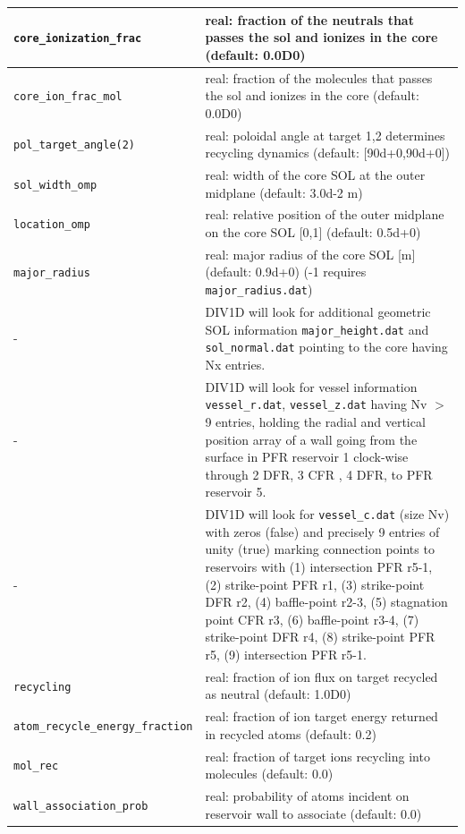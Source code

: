 \documentclass[amsmath,amssymb,a4]{revtex4-2}
\begin{document}
\begin{longtable}{| p{} | p{} |}
    {\tt core\_ionization\_frac } & real: fraction of the neutrals that passes the sol and ionizes in the core (default: 0.0D0) \\ \hline
       {\tt core\_ion\_frac\_mol } & real: fraction of the molecules that passes the sol and ionizes in the core (default: 0.0D0) \\ \hline 
    {\tt  pol\_target\_angle(2)}& real: poloidal angle at target 1,2  determines recycling dynamics (default: [90d+0,90d+0]) \\ \hline  
    {\tt sol\_width\_omp}       & real: width of the core SOL at the outer midplane (default: 3.0d-2 m)\\ \hline  
    {\tt location\_omp }        & real: relative position of the outer midplane on the core SOL [0,1] 	(default: 0.5d+0) \\ \hline 
    {\tt major\_radius }        &  real:  major radius of the core SOL [m] (default: 0.9d+0) (-1 requires {\tt major\_radius.dat})\\ \hline    
    - & DIV1D will look for additional geometric SOL information {\tt major\_height.dat} and  {\tt sol\_normal.dat} pointing to the core having Nx entries. \\ \hline 
    - & DIV1D will look for vessel information   {\tt vessel\_r.dat}, {\tt vessel\_z.dat} having Nv $>$ 9 entries, holding the radial and vertical position array of a wall going from the surface in PFR reservoir 1 clock-wise through 2 DFR, 3 CFR , 4 DFR, to PFR reservoir 5. \\
    - & DIV1D will look for  {\tt vessel\_c.dat} (size Nv) with zeros (false) and precisely 9 entries of unity (true) marking connection points to reservoirs with (1) intersection PFR r5-1, (2) strike-point PFR r1, (3) strike-point DFR r2, (4) baffle-point r2-3, (5) stagnation point CFR r3, (6) baffle-point r3-4, (7) strike-point DFR r4, (8) strike-point PFR r5, (9) intersection PFR r5-1. \\ \hline
    {\tt recycling}             & real: fraction of ion flux on target recycled as neutral (default: 1.0D0) \\ \hline
    {\tt atom\_recycle\_energy\_fraction} & real: fraction of ion target energy returned in recycled atoms (default: 0.2) \\ \hline
    {\tt mol\_rec}              & real: fraction of target ions recycling into molecules (default: 0.0) \\ \hline
    {\tt wall\_association\_prob} & real: probability of atoms incident on reservoir wall to associate (default: 0.0) \\ \hline

\end{longtable}
\end{document}
